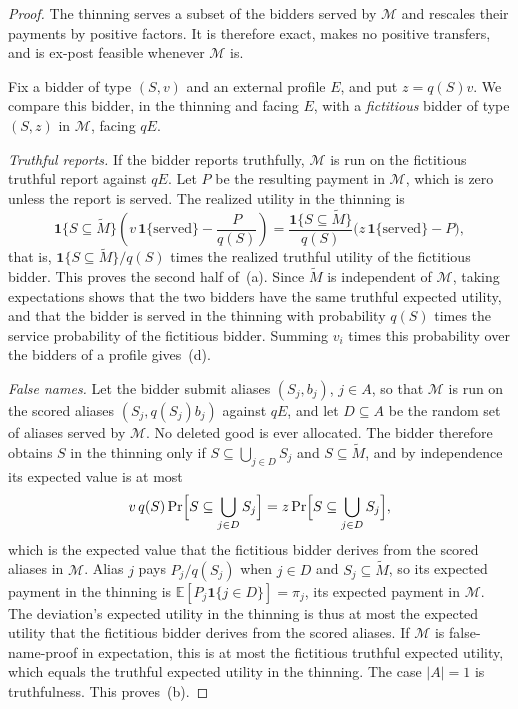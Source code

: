 \documentclass[format=acmsmall, review=false]{acmart}
\newcommand{\E}{\mathbb{E}}
\begin{document}
\begin{proof}
The thinning serves a subset of the bidders served by
\(\mathcal M\) and rescales their payments by positive factors.
It is therefore exact, makes no positive transfers, and is
ex-post feasible whenever \(\mathcal M\) is.

Fix a bidder of type \((S,v)\) and an external profile \(E\),
and put \(z=q(S)v\). We compare this bidder, in the thinning and
facing \(E\), with a \emph{fictitious} bidder of type \((S,z)\)
in \(\mathcal M\), facing \(qE\).

\emph{Truthful reports.} If the bidder reports truthfully,
\(\mathcal M\) is run on the fictitious truthful report against
\(qE\). Let \(P\) be the resulting payment in \(\mathcal M\),
which is zero unless the report is served. The realized utility
in the thinning is
\begin{equation}\label{eq:thin-truthful}
\mathbf{1}\{S\subseteq\widetilde M\}
\left(v\,\mathbf{1}\{\text{served}\}-\frac{P}{q(S)}\right)
=\frac{\mathbf{1}\{S\subseteq\widetilde M\}}{q(S)}
\bigl(z\,\mathbf{1}\{\text{served}\}-P\bigr),
\end{equation}
that is, \(\mathbf{1}\{S\subseteq\widetilde M\}/q(S)\) times the
realized truthful utility of the fictitious bidder. This proves
the second half of~(a). Since \(\widetilde M\) is independent of
\(\mathcal M\), taking expectations shows that the two bidders
have the same truthful expected utility, and that the bidder is
served in the thinning with probability \(q(S)\) times the
service probability of the fictitious bidder. Summing
\(v_i\) times this probability over the bidders of a profile
gives~(d).

\emph{False names.} Let the bidder submit aliases \((S_j,b_j)\),
\(j\in A\), so that \(\mathcal M\) is run on the scored aliases
\((S_j,q(S_j)b_j)\) against \(qE\), and let \(D\subseteq A\) be
the random set of aliases served by \(\mathcal M\). No deleted
good is ever allocated. The bidder therefore obtains \(S\) in the
thinning only if \(S\subseteq\bigcup_{j\in D}S_j\) and
\(S\subseteq\widetilde M\), and by independence its expected
value is at most
\[
v\,q(S)\Pr\Bigl[S\subseteq\bigcup_{j\in D}S_j\Bigr]
=z\Pr\Bigl[S\subseteq\bigcup_{j\in D}S_j\Bigr],
\]
which is the expected value that the fictitious bidder derives
from the scored aliases in \(\mathcal M\). Alias \(j\) pays
\(P_j/q(S_j)\) when \(j\in D\) and \(S_j\subseteq\widetilde M\),
so its expected payment in the thinning is
\(\E[P_j\mathbf{1}\{j\in D\}]=\pi_j\), its expected payment in
\(\mathcal M\). The deviation's expected utility in the thinning
is thus at most the expected utility that the fictitious bidder
derives from the scored aliases. If \(\mathcal M\) is
false-name-proof in expectation, this is at most the fictitious
truthful expected utility, which equals the truthful expected
utility in the thinning. The case \(|A|=1\) is truthfulness.
This proves~(b).


\end{proof}
\end{document}
